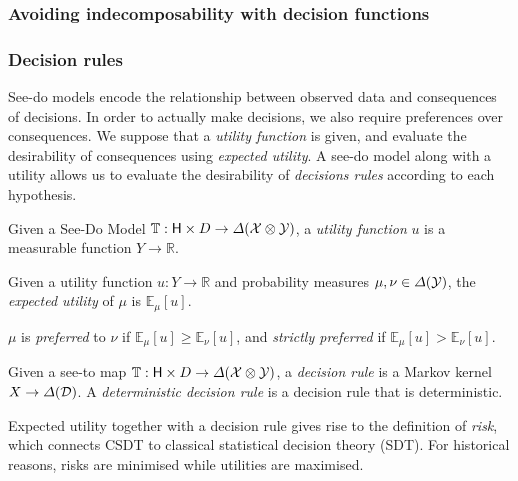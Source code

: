\subsubsection{Avoiding indecomposability with decision functions}


\subsubsection{Decision rules}

See-do models encode the relationship between observed data and consequences of decisions. In order to actually make decisions, we also require preferences over consequences. We suppose that a \emph{utility function} is given, and evaluate the desirability of consequences using \emph{expected utility}. A see-do model along with a utility allows us to evaluate the desirability of \emph{decisions rules} according to each hypothesis.

\begin{definition}
Given a See-Do Model $\mathbb{T}:\mathsf{H}\times D\to \Delta(\mathcal{X}\otimes\mathcal{Y})$, a \emph{utility function} $u$ is a measurable function $Y\to \mathbb{R}$. 
\end{definition}

\begin{definition}
Given a utility function $u:Y\to \mathbb{R}$ and probability measures $\mu,\nu\in \Delta(\mathcal{Y})$, the \emph{expected utility} of $\mu$ is $\mathbb{E}_{\mu}[u]$.

$\mu$ is \emph{preferred} to $\nu$ if $\mathbb{E}_{\mu}[u]\geq \mathbb{E}_{\nu}[u]$, and \emph{strictly preferred} if $\mathbb{E}_{\mu}[u]>\mathbb{E}_{\nu}[u]$.
\end{definition}

\begin{definition}
Given a see-to map $\mathbb{T}:\mathsf{H}\times D\to \Delta(\mathcal{X}\otimes\mathcal{Y})$, a \emph{decision rule} is a Markov kernel $X\to \Delta(\mathcal{D})$. A \emph{deterministic decision rule} is a decision rule that is deterministic.

\end{definition}

Expected utility together with a decision rule gives rise to the definition of \emph{risk}, which connects CSDT to classical statistical decision theory (SDT). For historical reasons, risks are minimised while utilities are maximised.


